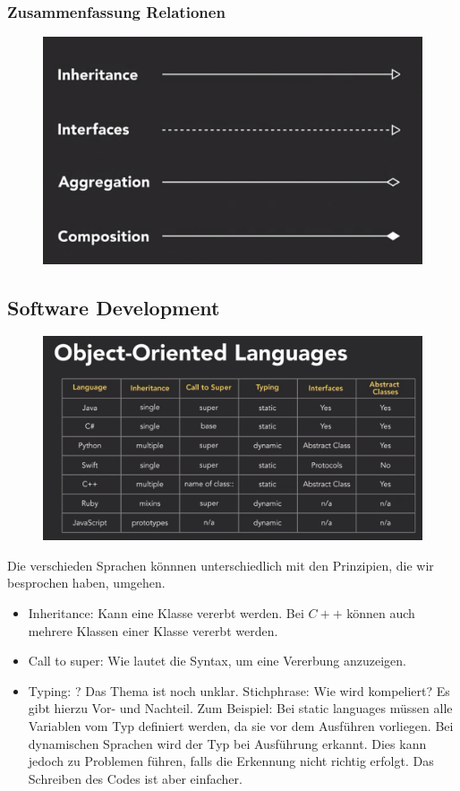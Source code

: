 \subsubsection{Zusammenfassung Relationen}
\begin{figure}[H]
	\centering
	\includegraphics[scale = 0.2]{attachment/chapter_2/Scc017}
	\caption{}
	\label{fig:Scc017}
\end{figure}
\subsection{Software Development}

\begin{figure}[H]
	\centering
	\includegraphics[scale = 0.2]{attachment/chapter_2/Scc018}
	\caption{}
	\label{fig:Scc018}
\end{figure}
Die verschieden Sprachen könnnen unterschiedlich mit den Prinzipien, die wir besprochen haben, umgehen.
\begin{itemize}
	\item Inheritance: Kann eine Klasse vererbt werden. Bei $C++$ können auch mehrere Klassen einer Klasse vererbt werden.
	\item Call to super: Wie lautet die Syntax, um eine Vererbung anzuzeigen.
	\item Typing: ? Das Thema ist noch unklar. Stichphrase: Wie wird kompeliert? Es gibt hierzu Vor- und Nachteil. Zum Beispiel: Bei static languages müssen alle Variablen vom Typ definiert werden, da sie vor dem Ausführen vorliegen. Bei dynamischen Sprachen wird der Typ bei Ausführung erkannt. Dies kann jedoch zu Problemen führen, falls die Erkennung nicht richtig erfolgt. Das Schreiben des Codes ist aber einfacher.
\end{itemize}
